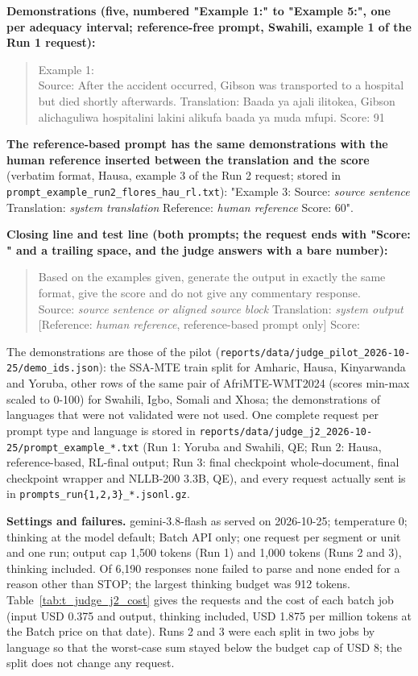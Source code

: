 \textbf{Demonstrations (five, numbered "Example 1:" to "Example 5:", one per adequacy interval; reference-free prompt, Swahili, example 1 of the Run 1 request):}

\begin{quote}
Example 1:\\
Source: After the accident occurred, Gibson was transported to a hospital but died shortly afterwards. Translation: Baada ya ajali ilitokea, Gibson alichaguliwa hospitalini lakini alikufa baada ya muda mfupi. Score: 91
\end{quote}

\textbf{The reference-based prompt has the same demonstrations with the human reference inserted between the translation and the score} (verbatim format, Hausa, example 3 of the Run 2 request; stored in \texttt{prompt\_example\_run2\_flores\_hau\_rl.txt}): "Example 3: Source: \emph{source sentence} Translation: \emph{system translation} Reference: \emph{human reference} Score: 60".

\textbf{Closing line and test line (both prompts; the request ends with "Score: " and a trailing space, and the judge answers with a bare number):}

\begin{quote}
Based on the examples given, generate the output in exactly the same format, give the score and do not give any commentary response.\\
Source: \emph{source sentence or aligned source block} Translation: \emph{system output} {[}Reference: \emph{human reference}, reference-based prompt only{]} Score:
\end{quote}

The demonstrations are those of the pilot (\texttt{reports/data/judge\_pilot\_2026-10-25/demo\_ids.json}): the SSA-MTE train split for Amharic, Hausa, Kinyarwanda and Yoruba, other rows of the same pair of AfriMTE-WMT2024 (scores min-max scaled to 0-100) for Swahili, Igbo, Somali and Xhosa; the demonstrations of languages that were not validated were not used. One complete request per prompt type and language is stored in \texttt{reports/data/judge\_j2\_2026-10-25/prompt\_example\_*.txt} (Run 1: Yoruba and Swahili, QE; Run 2: Hausa, reference-based, RL-final output; Run 3: final checkpoint whole-document, final checkpoint wrapper and NLLB-200 3.3B, QE), and every request actually sent is in \texttt{prompts\_run\{1,2,3\}\_*.jsonl.gz}.

\textbf{Settings and failures.} gemini-3.8-flash as served on 2026-10-25; temperature 0; thinking at the model default; Batch API only; one request per segment or unit and one run; output cap 1,500 tokens (Run 1) and 1,000 tokens (Runs 2 and 3), thinking included. Of 6,190 responses none failed to parse and none ended for a reason other than STOP; the largest thinking budget was 912 tokens. Table~\ref{tab:t_judge_j2_cost} gives the requests and the cost of each batch job (input USD 0.375 and output, thinking included, USD 1.875 per million tokens at the Batch price on that date). Runs 2 and 3 were each split in two jobs by language so that the worst-case sum stayed below the budget cap of USD 8; the split does not change any request.

